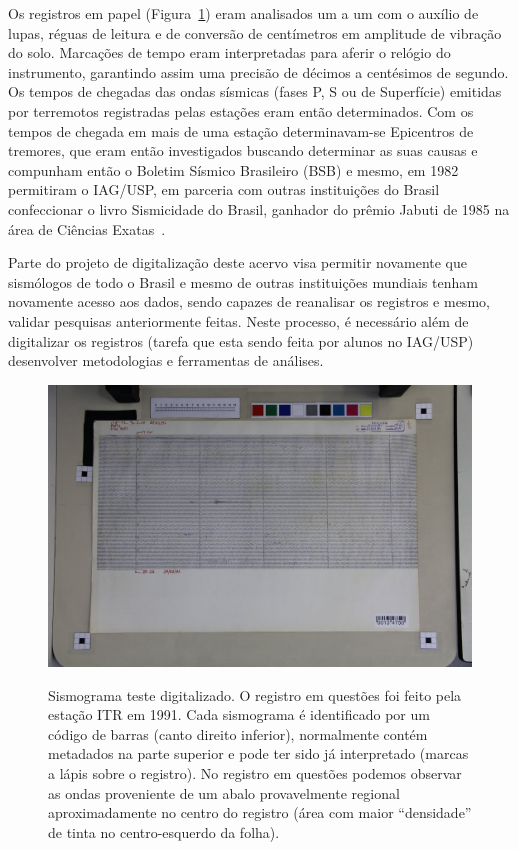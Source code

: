 \documentclass{article}
\begin{document}
Os registros em papel (Figura~\ref{sismograma}) eram analisados um a um com o auxílio
de lupas, réguas de leitura e de conversão de centímetros em amplitude
de vibração do solo. Marcações de tempo eram interpretadas para aferir
o relógio do instrumento, garantindo assim uma precisão de décimos a
centésimos de segundo. Os tempos de chegadas das ondas sísmicas (fases
P, S ou de Superfície) emitidas por terremotos registradas pelas
estações eram então determinados. Com os tempos de chegada em mais de
uma estação determinavam-se Epicentros de tremores, que eram então
investigados buscando determinar as suas causas e compunham então o
Boletim Sísmico Brasileiro (BSB) e mesmo, em 1982 permitiram o
IAG/USP, em parceria com outras instituições do Brasil confeccionar o
livro Sismicidade do Brasil, ganhador do prêmio Jabuti de 1985 na área
de Ciências Exatas~\cite{sismicidade-brasil}.

Parte do projeto de digitalização deste acervo visa permitir novamente
que sismólogos de todo o Brasil e mesmo de outras instituições
mundiais tenham novamente acesso aos dados, sendo capazes de
reanalisar os registros e mesmo, validar pesquisas anteriormente
feitas. Neste processo, é necessário além de digitalizar os registros
(tarefa que esta sendo feita por alunos no IAG/USP) desenvolver
metodologias e ferramentas de análises.

\begin{figure}
  \begin{center}
    \includegraphics[scale=0.26]{sismograma.jpg}
\label{sismograma}
\caption{Sismograma teste digitalizado. O registro em questões foi feito pela estação ITR em 1991. Cada sismograma é identificado por um código de barras (canto direito inferior), normalmente contém metadados na parte superior e pode ter sido já interpretado (marcas a lápis sobre o registro). No registro em questões podemos observar as ondas proveniente de um abalo provavelmente regional aproximadamente no centro do registro (área com maior “densidade” de tinta no centro-esquerdo da folha).}
\end{center}
\end{figure}
\end{document}

